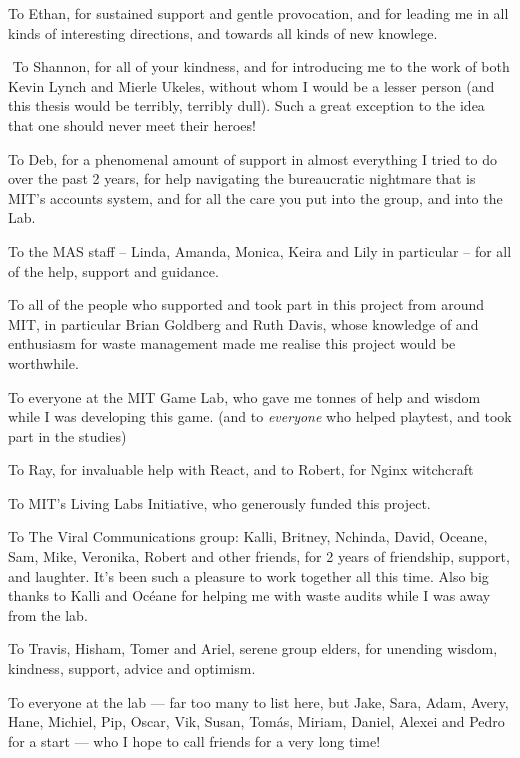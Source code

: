 \documentclass[nofonts,nols,justified,nobib]{tufte-book}
\begin{document}
To Ethan, for sustained support and gentle provocation, and for leading me in all kinds of interesting directions, and towards all kinds of new knowlege.

 To Shannon, for all of your kindness, and for introducing me to the work of both Kevin Lynch and Mierle Ukeles, without whom I would be a lesser person (and this thesis would be terribly, terribly dull). Such a great exception to the idea that one should never meet their heroes!

To Deb, for a phenomenal amount of support in almost everything I tried to do over the past 2 years, for help navigating the bureaucratic nightmare that is MIT’s accounts system, and for all the care you put into the group, and into the Lab.

To the MAS staff -- Linda, Amanda, Monica, Keira and Lily in particular -- for all of the help, support and guidance.

To all of the people who supported and took part in this project from around MIT, in particular Brian Goldberg and Ruth Davis, whose knowledge of and enthusiasm for waste management made me realise this project would be worthwhile.

To everyone at the MIT Game Lab, who gave me tonnes of help and wisdom while I was developing this game. (and to \emph{everyone} who helped playtest, and took part in the studies)

To Ray, for invaluable help with React, and to Robert, for Nginx witchcraft

To MIT’s Living Labs Initiative, who generously funded this project.

To The Viral Communications group: Kalli, Britney, Nchinda, David, Oceane, Sam, Mike, Veronika, Robert and other friends, for 2 years of friendship, support, and laughter. It’s been such a pleasure to work together all this time. Also big thanks to Kalli and Oc\'eane for helping me with waste audits while I was away from the lab.

To Travis, Hisham, Tomer and Ariel, serene group elders, for unending wisdom, kindness, support, advice and optimism.

To everyone at the lab — far too many to list here, but Jake, Sara, Adam, Avery, Hane, Michiel, Pip, Oscar, Vik, Susan, Tom\'as, Miriam, Daniel, Alexei and Pedro for a start — who I hope to call friends for a very long time!
\end{document}
